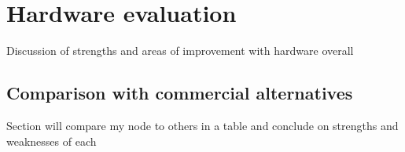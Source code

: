 \section{Hardware evaluation}

Discussion of strengths and areas of improvement with hardware overall

\subsection{Comparison with commercial alternatives}

Section will compare my node to others in a table and conclude on strengths and
weaknesses of each